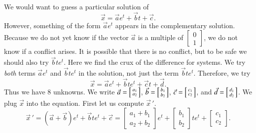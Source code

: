 \documentclass[12pt]{book}
\begin{document}
\begin{example}
We would want to guess a particular solution of
\begin{equation*}
\vec{x} = 
\vec{a}
e^{t}
+
\vec{b}
t +
\vec{c} .
\end{equation*}
However, something of the form $\vec{a} e^t$ appears in the complementary
solution.  Because we do not yet know if the vector $\vec{a}$
is a multiple of $\left[ \begin{smallmatrix}
0 \\
1
\end{smallmatrix} \right]$, we do not know if a conflict
arises.  It is possible that there is no conflict,
but to be safe we should also try
$\vec{b} t e^t$.
Here we find
the crux of the difference for systems.  We try
\emph{both} terms $\vec{a} e^t$ and $\vec{b} t e^t$ in the solution,
not just the term $\vec{b} t e^t$.
Therefore, we try
\begin{equation*}
\vec{x} = 
\vec{a}
e^{t}
+
\vec{b}
t
e^{t}
+
\vec{c}
t +
\vec{d}.
\end{equation*}
Thus we have 8 unknowns.  We write
$\vec{a} =
\Bigl[ \begin{smallmatrix} a_1 \\ a_2 \end{smallmatrix} \Bigr]$,
$\vec{b} =
\Bigl[ \begin{smallmatrix} b_1 \\ b_2 \end{smallmatrix} \Bigr]$,
$\vec{c} =
\Bigl[ \begin{smallmatrix} c_1 \\ c_2 \end{smallmatrix} \Bigr]$,
and
$\vec{d} =
\Bigl[ \begin{smallmatrix} d_1 \\ d_2 \end{smallmatrix} \Bigr]$.
We plug $\vec{x}$ into the equation.  First
let us compute ${\vec{x}\,}'$.
\begin{equation*}
{\vec{x}\,}' = 
\left( \vec{a} + \vec{b} \right)
e^{t}
+
\vec{b}
t
e^{t}
+
\vec{c} =
\begin{bmatrix}
a_1 + b_1 \\ a_2+b_2
\end{bmatrix}
e^{t}
+
\begin{bmatrix}
b_1 \\ b_2
\end{bmatrix}
t e^{t}
+
\begin{bmatrix}
c_1 \\ c_2
\end{bmatrix} .
\end{equation*}

\end{example}
\end{document}
